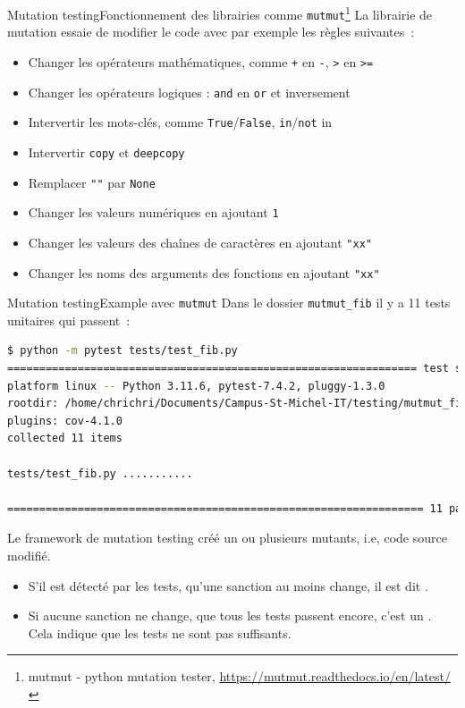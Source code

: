 \documentclass{beamer}
\begin{document}
    \begin{frame}{Mutation testing}{Fonctionnement des librairies comme \lstinline{mutmut}\footnote{mutmut - python mutation tester, \url{https://mutmut.readthedocs.io/en/latest/}}}
        \transdissolve
        La librairie de mutation essaie de modifier le code avec par exemple les règles suivantes~:
        \begin{itemize}
            \item Changer les opérateurs mathématiques, comme \lstinline{+} en \lstinline{-}, \lstinline{>} en \lstinline{>=}
            \item Changer les opérateurs logiques : \lstinline{and} en \lstinline{or} et inversement
            \item Intervertir les mots-clés, comme \lstinline{True}/\lstinline{False}, \lstinline{in}/\lstinline{not} in
            \item Intervertir \lstinline{copy} et \lstinline{deepcopy}
            \item Remplacer \lstinline{""} par \lstinline{None}
            \item Changer les valeurs numériques en ajoutant \lstinline{1}
            \item Changer les valeurs des chaînes de caractères en ajoutant \lstinline{"xx"}
            \item Changer les noms des arguments des fonctions en ajoutant \lstinline{"xx"}
        \end{itemize}
    \end{frame}


    \begin{frame}[fragile]{Mutation testing}{Example avec \lstinline{mutmut}}
        \transdissolve
        Dans le dossier \lstinline{mutmut_fib} il y a 11 tests unitaires qui passent~:
        \begin{lstlisting}[language=bash]
$ python -m pytest tests/test_fib.py
================================================================ test session starts ======
platform linux -- Python 3.11.6, pytest-7.4.2, pluggy-1.3.0
rootdir: /home/chrichri/Documents/Campus-St-Michel-IT/testing/mutmut_fib
plugins: cov-4.1.0
collected 11 items

tests/test_fib.py ...........                                                                                                                  [100%]

================================================================= 11 passed in 0.04s ======
        \end{lstlisting}
        Le framework de mutation testing créé un ou plusieurs mutants, i.e, code source modifié.
        \begin{itemize}
            \item S'il est détecté par les tests, qu'une sanction au moins change, il est dit .
            \item Si aucune sanction ne change, que tous les tests passent encore, c'est un . Cela indique que les tests ne sont pas suffisants.
        \end{itemize}
    \end{frame}
\end{document}
